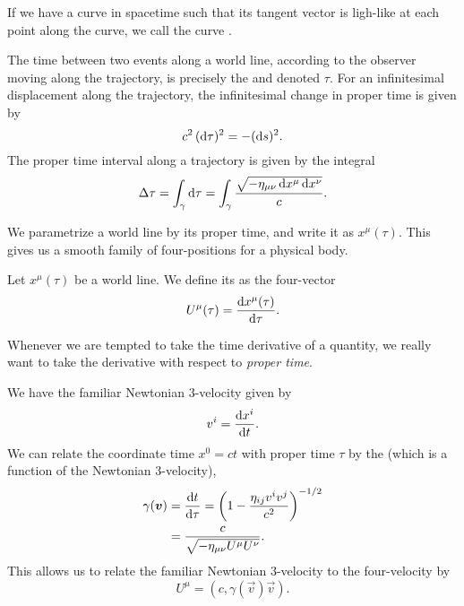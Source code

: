 If we have a curve in spacetime such that its tangent vector is
ligh-like at each point along the curve, we call the curve
. 


The time between two events along a world line, according to the
observer moving along the trajectory, is precisely the
 and denoted $\tau$. For an infinitesimal
displacement along the trajectory, the infinitesimal change in proper
time is given by
\begin{equation}
c^{2}\,(\mathrm{d}\tau)^{2} = -(\mathrm{d} s)^{2}.
\end{equation}
The proper time interval along a trajectory is given by the integral
\begin{equation}
\Delta\tau = \int_{\gamma}\mathrm{d}\tau =
\int_{\gamma}\frac{\sqrt{-\eta_{\mu\nu}\,\mathrm{d} x^{\mu}\,\mathrm{d} x^{\nu}}}{c}.
\end{equation}

We parametrize a world line by its proper time, and write it as
$x^{\mu}(\tau)$. This gives us a smooth family of four-positions for a
physical body.

\begin{definition}
Let $x^{\mu}(\tau)$ be a world line. We define its 
as the four-vector
\begin{equation*}
U^{\mu}(\tau) = \frac{\mathrm{d} x^{\mu}(\tau)}{\mathrm{d}\tau}.
\end{equation*}
\end{definition}

\begin{remark}
Whenever we are tempted to take the time derivative of a quantity, we
really want to take the derivative with respect to \emph{proper time}.
\end{remark}

We have the familiar Newtonian 3-velocity given by
\begin{equation}
v^{i} = \frac{\mathrm{d} x^{i}}{\mathrm{d} t}.
\end{equation}
We can relate the coordinate time $x^{0}=ct$ with proper time $\tau$ by
the  (which is a function of the Newtonian 3-velocity),
\begin{equation}
  \begin{split}
\gamma(\boldsymbol{v}) &= \frac{\mathrm{d} t}{\mathrm{d}\tau} = \left(1 - \frac{\eta_{ij}v^{i}v^{j}}{c^{2}}\right)^{-1/2}\\
&=\frac{c}{\sqrt{-\eta_{\mu\nu}U^{\mu}U^{\nu}}}.
  \end{split}
\end{equation}
This allows us to relate the familiar Newtonian 3-velocity
to the four-velocity by
\begin{equation}
U^{\mu} = (c, \gamma(\vec{v})\vec{v}).
\end{equation}


